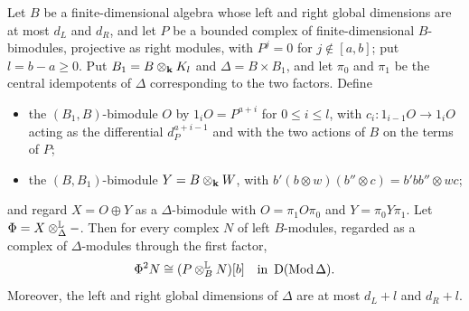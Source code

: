 \begin{proposition}
  \label{prop:simulation}
  Let $B$ be a finite-dimensional algebra whose left and right global
  dimensions are at most $d_L$ and $d_R$, and let $P$ be a bounded complex of
  finite-dimensional $B$-bimodules, projective as right modules, with ${P^j=0}$
  for ${j\notin[a,b]}$; put ${l=b-a\geq0}$. Put ${B_1=B\otimes_{\mathbf{k}} K_l}$ and
  ${\Delta=B\times B_1}$, and let $\pi_0$ and $\pi_1$ be the central idempotents
  of $\Delta$ corresponding to the two factors. Define
  \begin{itemize}
    \item the $(B_1,B)$-bimodule $O$ by ${1_iO=P^{a+i}}$ for ${0\leq i\leq l}$, with
      ${c_i\colon1_{i-1}O\to1_iO}$ acting as the differential $d_P^{a+i-1}$ and
      with the two actions of $B$ on the terms of $P$;
    \item the $(B,B_1)$-bimodule ${Y=B\otimes_{\mathbf{k}} W}$, with
      ${b'(b\otimes w)(b''\otimes c)=b'bb''\otimes wc}$;
  \end{itemize}
  and regard ${X=O\oplus Y}$ as a $\Delta$-bimodule with ${O=\pi_1O\pi_0}$ and
  ${Y=\pi_0Y\pi_1}$. Let ${\Phi=X\Lotimes[\Delta]-}$. Then for every complex $N$
  of left $B$-modules, regarded as a complex of $\Delta$-modules through the
  first factor,
  \[
    \Phi^2N\cong(P\Lotimes[B]N)[b]\quad\text{in }\DerCat{\operatorname{Mod}
    \Delta}.
  \]
  Moreover, the left and right global dimensions of $\Delta$ are at most
  ${d_L+l}$ and ${d_R+l}$.
\end{proposition}

